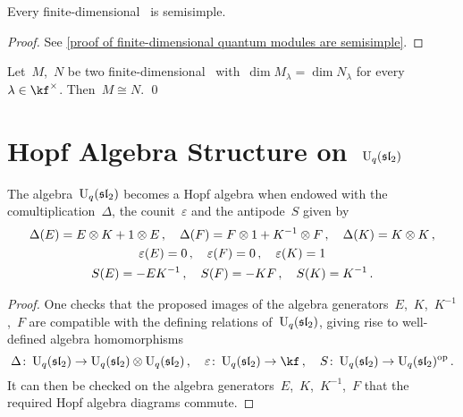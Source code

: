 \documentclass[a4paper, 11pt, oneside]{scrartcl}
\begin{document}
\begin{theorem}
  \label{finite-dimensional quantum modules are semisimple}
  Every finite-dimensional~ is semisimple.
\end{theorem}

\begin{proof}[Proof]
  See \cref{proof of finite-dimensional quantum modules are semisimple}.
\end{proof}
  
\begin{corollary}
  \label{decomposition from quantum weight spaces}
  Let~$M$,~$N$ be two finite-dimensional~ with~$\dim M_\lambda = \dim N_\lambda$ for every~$\lambda \in \kf^\times$.
  Then~$M \cong N$.
  \qed
\end{corollary}





\section{Hopf Algebra Structure on~\texorpdfstring{$\operatorname{U}_q(\mathfrak{sl}_2)$}{Uq(sl2)}}


\begin{proposition}
  \label{hopf algebra structure on quantum sl2}
  The algebra~$\operatorname{U}_q(\mathfrak{sl}_2)$ becomes a Hopf algebra when endowed with the comultiplication~$\Delta$, the counit~$\varepsilon$ and the antipode~$S$ given by
  \begin{gather*}
    \Delta(E) = E \otimes K + 1 \otimes E \,,
    \quad
    \Delta(F) = F \otimes 1 + K^{-1} \otimes F \,,
    \quad
    \Delta(K) = K \otimes K \,,
    \\
    \varepsilon(E) = 0 \,,
    \quad
    \varepsilon(F) = 0 \,,
    \quad
    \varepsilon(K) = 1
    \\
    S(E) = -E K^{-1} \,,
    \quad
    S(F) = -KF \,,
    \quad
    S(K) = K^{-1} \,.
  \end{gather*}
\end{proposition}

\begin{proof}
  One checks that the proposed images of the algebra generators~$E$,~$K$,~$K^{-1}$,~$F$ are compatible with the defining relations of~$\operatorname{U}_q(\mathfrak{sl}_2)$, giving rise to well-defined algebra homomorphisms
  \[
    \Delta \colon \Univ_q(\sllie_2) \to \Univ_q(\sllie_2) \tensor \Univ_q(\sllie_2) \,,
    \quad
    \varepsilon \colon \Univ_q(\sllie_2) \to \kf \,,
    \quad
    S \colon \Univ_q(\sllie_2) \to \Univ_q(\sllie_2)^{\op} \,.
  \]
  It can then be checked on the algebra generators~$E$,~$K$,~$K^{-1}$,~$F$ that the required Hopf algebra diagrams commute.
\end{proof}
\end{document}
